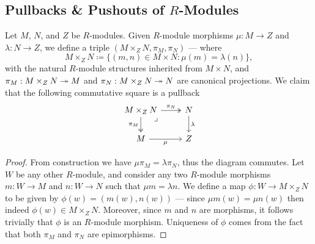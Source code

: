 \subsection{Pullbacks \& Pushouts of \texorpdfstring{\(R\)}{R}-Modules}

\begin{proposition}[Pullback]
    \label{prop:pullback-modules}
    Let \(M\), \(N\), and \(Z\) be \(R\)-modules. Given \(R\)-module morphisms
    \(\mu: M \to Z\) and \(\lambda: N \to Z\), we define a triple
    \((M \times_Z N, \pi_M, \pi_N)\) --- where
    \[
        M \times_Z N \coloneq \{(m, n) \in M \times N \colon \mu(m) = \lambda(n)\},
    \]
    with the natural \(R\)-module structures inherited from \(M \times N\), and
    \(\pi_M: M \times_Z N \twoheadrightarrow M\) and \(\pi_N: M \times_Z N \twoheadrightarrow N\) are
    canonical projections. We claim that the following commutative square is a
    pullback
    \[
        \begin{tikzcd}
            M \times_Z N \ar[d, two heads, "\pi_M"'] \ar[r, two heads, "\pi_N"]
            \ar[dr, phantom, "\lrcorner", very near start]
            &N \ar[d, "\lambda"] \\
            M \ar[r, "\mu"'] &Z
        \end{tikzcd}
    \]
\end{proposition}

\begin{proof}
    From construction we have \(\mu \pi_M = \lambda \pi_N\), thus the diagram
    commutes. Let \(W\) be any other \(R\)-module, and consider any two \(R\)-module
    morphisms \(m: W \to M\) and \(n: W \to N\) such that \(\mu m = \lambda n\). We
    define a map \(\phi: W \to M \times_Z N\) to be given by
    \(\phi(w) = (m(w), n(w))\) --- since \(\mu m(w) = \mu n(w)\) then indeed
    \(\phi(w) \in M \times_Z N\). Moreover, since \(m\) and \(n\) are morphisms, it
    follows trivially that \(\phi\) is an \(R\)-module morphism. Uniqueness of
    \(\phi\) comes from the fact that both \(\pi_M\) and \(\pi_N\) are epimorphisms.
\end{proof}


